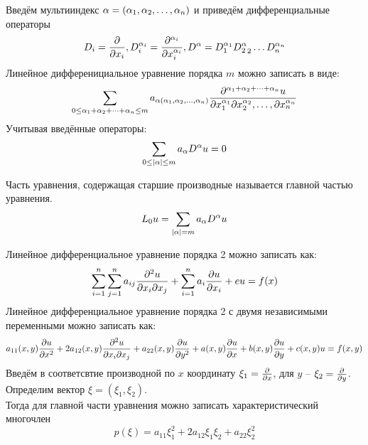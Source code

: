 \documentclass[../main.tex]{subfiles}
\begin{document}
Введём мультииндекс $\alpha = (\alpha_1,\alpha_2,\dots,\alpha_n)$ и приведём дифференциальные операторы
\[D_i=\frac{\partial  }{\partial x_i},D^{\alpha_i}_i=\frac{\partial ^{\alpha_i }}{\partial x_i^{\alpha_i}}, D^\alpha = D^{\alpha_1}_1 D{^\alpha_2}_2\dots D^{\alpha_n}_n\]
Линейное дифференициальное уравнение порядка $m$ можно записать в виде:
\[
	\sum_{0 \leq \alpha_1+\alpha_2+\dots+\alpha_n \leq m}
	a_{\alpha(\alpha_1, \alpha_2, \dots, \alpha_n)}
	\frac{\partial ^{\alpha_1+\alpha_2+\dots+\alpha_n}u}{\partial x_1^{\alpha_1} \partial{x_2^{\alpha_2}}, \dots, \partial{x_n^{\alpha_n}}}
\]
Учитывая введённые операторы:
\[
	\sum_{0 \leq |\alpha| \leq m}a_\alpha D^\alpha u = 0
\]

\begin{definition}
	Часть уравнения, содержащая старшие производные называется
	главной частью уравнения.
	\[L_0u = \sum_{|\alpha|=m} a_\alpha D^\alpha u\]
\end{definition}
Линейное дифференциальное уравнение порядка 2 можно записать как:
\[
	\sum^n_{i=1}\sum^n_{j=1}a_{ij}\frac{\partial ^2u}{\partial x_i \partial{x_j}} + 
	\sum^n_{i=1}a_i\frac{\partial u}{\partial x_i} + eu = f(x)
\]
Линейное дифференциальное уравнение порядка 2 с двумя 
независимыми переменными можно записать как:
\begin{equation}
	\label{eq:1.1} %
	a_{11}(x,y)\pderiv{u}{x^2} + 2a_{12}(x,y)\pderiv{^2u}{x_i \partial{x_j}} +
	a_{22}(x,y)\pderiv{u}{y^2} + a(x,y)\pderiv{u}{x} + b(x,y)\pderiv{u}{y} + c(x,y)u = f(x,y)
\end{equation}
Введём в соответсвтие производной по $x$ координату $\xi_1=\frac{\partial  }{\partial x}$,
для $y$ -- $\xi_2 = \frac{\partial  }{\partial y}$. Определим вектор $\xi=(\xi_1, \xi_2)$.\\
Тогда для главной части уравнения можно записать характеристический многочлен
\[
	p(\xi)=a_{11}\xi_1^2 + 2a_{12}\xi_1\xi_2 + a_{22}\xi_2^2
\]
\end{document}
